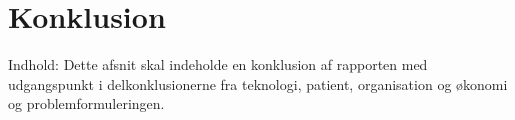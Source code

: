 \section{Konklusion}
Indhold: Dette afsnit skal indeholde en konklusion af rapporten med udgangspunkt i delkonklusionerne fra teknologi, patient, organisation og økonomi og problemformuleringen. 